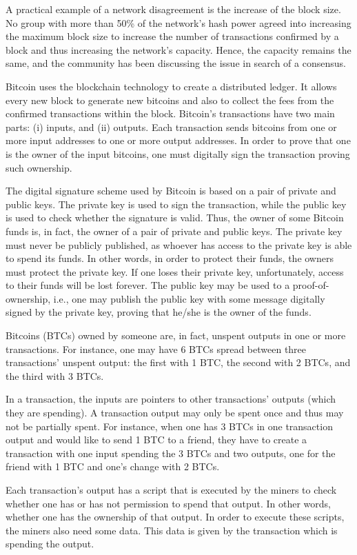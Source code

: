 A practical example of a network disagreement is the increase of the block size. No group with more than 50\% of the network's hash power agreed into increasing the maximum block size to increase the number of transactions confirmed by a block and thus increasing the network's capacity. Hence, the capacity remains the same, and the community has been discussing the issue in search of a consensus.

Bitcoin uses the blockchain technology to create a distributed ledger. It allows every new block to generate new bitcoins and also to collect the fees from the confirmed transactions within the block. Bitcoin's transactions have two main parts: (i) inputs, and (ii) outputs. Each transaction sends bitcoins from one or more input addresses to one or more output addresses. In order to prove that one is the owner of the input bitcoins, one must digitally sign the transaction proving such ownership.

The digital signature scheme used by Bitcoin is based on a pair of private and public keys. The private key is used to sign the transaction, while the public key is used to check whether the signature is valid. Thus, the owner of some Bitcoin funds is, in fact, the owner of a pair of private and public keys. The private key must never be publicly published, as whoever has access to the private key is able to spend its funds. In other words, in order to protect their funds, the owners must protect the private key. If one loses their private key, unfortunately, access to their funds will be lost forever. The public key may be used to a proof-of-ownership, i.e., one may publish the public key with some message digitally signed by the private key, proving that he/she is the owner of the funds.

Bitcoins (BTCs) owned by someone are, in fact, unspent outputs in one or more transactions. For instance, one may have 6 BTCs spread between three transactions' unspent output: the first with 1 BTC, the second with 2 BTCs, and the third with 3 BTCs.

In a transaction, the inputs are pointers to other transactions' outputs (which they are spending). A transaction output may only be spent once and thus may not be partially spent. For instance, when one has 3 BTCs in one transaction output and would like to send 1 BTC to a friend, they have to create a transaction with one input spending the 3 BTCs and two outputs, one for the friend with 1 BTC and one's change with 2 BTCs.

Each transaction's output has a script that is executed by the miners to check whether one has or has not permission to spend that output. In other words, whether one has the ownership of that output. In order to execute these scripts, the miners also need some data. This data is given by the transaction which is spending the output.

